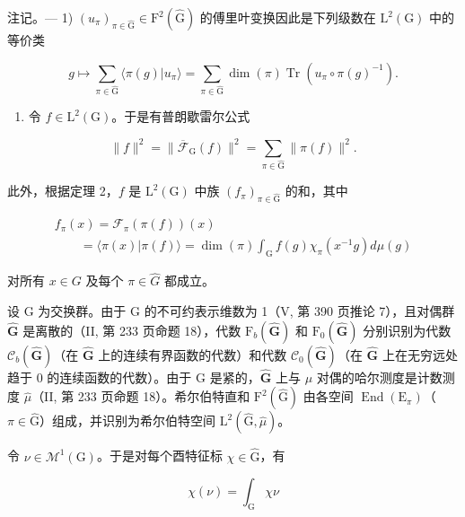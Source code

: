 注记。--- 1) \((u_{\pi})_{\pi \in \widehat{\mathrm{G}}} \in \mathrm{F}^2(\widehat{\mathrm{G}})\) 的傅里叶变换因此是下列级数在 \(\mathrm{L}^2(\mathrm{G})\) 中的等价类

\[
g \mapsto \sum_ {\pi \in \widehat {\mathrm{G}}} \langle \pi (g) | u _ {\pi} \rangle = \sum_ {\pi \in \widehat {\mathrm{G}}} \dim (\pi) \operatorname{Tr} (u _ {\pi} \circ \pi (g) ^ {- 1}).
\]

\begin{enumerate}
\def\labelenumi{\arabic{enumi})}
\setcounter{enumi}{1}
\tightlist
\item
  令 \(f \in \mathrm{L}^2(\mathrm{G})\)。于是有普朗歇雷尔公式
\end{enumerate}

\[
\| f \| ^ {2} = \| \overline {{\mathcal {F}}} _ {\mathrm{G}} (f) \| ^ {2} = \sum_ {\pi \in \widehat {\mathrm{G}}} \| \pi (f) \| ^ {2}.
\]

此外，根据定理 2，\(f\) 是 \(\mathrm{L}^2 (\mathrm{G})\) 中族 \((f_{\pi})_{\pi \in \widehat{\mathrm{G}}}\) 的和，其中

\[
\begin{array}{l} f _ {\pi} (x) = \mathcal {F} _ {\pi} (\pi (f)) (x) \\ \qquad = \langle \pi (x) | \pi (f) \rangle = \dim (\pi) \int_ {\mathrm{G}} f (g) \chi_ {\pi} (x ^ {- 1} g) d \mu (g) \end{array}
\]

对所有 \(x \in G\) 及每个 \(\pi \in \widehat{G}\) 都成立。

设 G 为交换群。由于 G 的不可约表示维数为 1（V, 第 390 页推论 7），且对偶群 \(\widehat{\mathbf{G}}\) 是离散的（II, 第 233 页命题 18），代数 \(\mathrm{F}_b(\widehat{\mathbf{G}})\) 和 \(\mathrm{F}_0(\widehat{\mathbf{G}})\) 分别识别为代数 \(\mathcal{C}_b(\widehat{\mathbf{G}})\)（在 \(\widehat{\mathbf{G}}\) 上的连续有界函数的代数）和代数 \(\mathcal{C}_0(\widehat{\mathbf{G}})\)（在 \(\widehat{\mathbf{G}}\) 上在无穷远处趋于 0 的连续函数的代数）。由于 G 是紧的，\(\widehat{\mathbf{G}}\) 上与 \(\mu\) 对偶的哈尔测度是计数测度 \(\widehat{\mu}\)（II, 第 233 页命题 18）。希尔伯特直和 \(\mathrm{F}^2 (\widehat{\mathrm{G}})\) 由各空间 \(\operatorname{End}(\mathrm{E}_{\pi})\)（\(\pi \in \widehat{\mathrm{G}}\)）组成，并识别为希尔伯特空间 \(\mathrm{L}^2 (\widehat{\mathrm{G}},\widehat{\mu})\)。

令 \(\nu \in \mathcal{M}^1 (\mathrm{G})\)。于是对每个酉特征标 \(\chi \in \widehat{\mathrm{G}}\)，有

\[
\chi (\nu) = \int_ {\mathrm{G}} \chi \nu
\]

